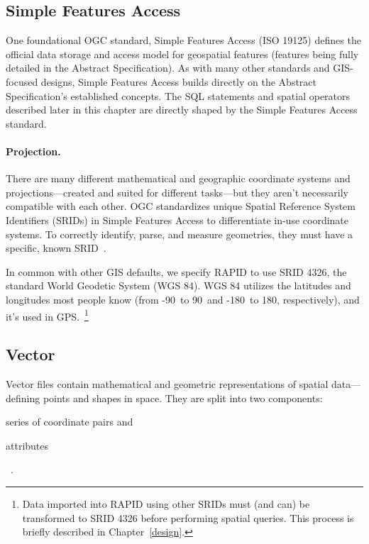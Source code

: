 \subsection{Simple Features Access}
One foundational OGC standard, Simple Features Access (ISO 19125) defines the official data storage and access model for geospatial features (features being fully detailed in the Abstract Specification). As with many other standards and GIS-focused designs, Simple Features Access builds directly on the Abstract Specification's established concepts. The SQL statements and spatial operators described later in this chapter are directly shaped by the Simple Features Access standard.

\paragraph{Projection.}
There are many different mathematical and geographic coordinate systems and projections---created and suited for different tasks---but they aren't necessarily compatible with each other. OGC standardizes unique Spatial Reference System Identifiers (SRIDs) in Simple Features Access to differentiate in-use coordinate systems. To correctly identify, parse, and measure geometries, they must have a specific, known SRID~\cite{Kottman2009}.
  
In common with other GIS defaults, we specify RAPID to use SRID 4326, the standard World Geodetic System (WGS 84). WGS 84 utilizes the latitudes and longitudes most people know (from -90\textdegree~to 90\textdegree~and -180\textdegree~to 180\textdegree, respectively), and it's used in GPS.~\footnote{Data imported into RAPID using other SRIDs must (and can) be transformed to SRID 4326 before performing spatial queries. This process is briefly described in Chapter~\ref{design}.}

\subsection{Vector}
\label{sec:vector}
Vector files contain mathematical and geometric representations of spatial data---defining points and shapes in space. They are split into two components: \begin{enumerate*}[label=\itshape\arabic*\upshape)]
\item series of coordinate pairs and
\item attributes
\end{enumerate*}~\cite{gentle_intro}.

